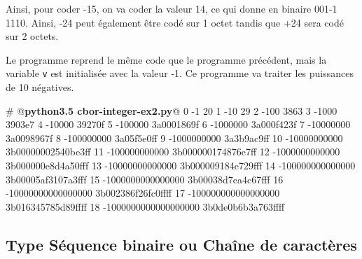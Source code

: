        \vspace{1em}

Ainsi, pour coder -15, on va coder la valeur 14, ce qui donne en binaire 001-1 1110. Ainsi, -24 peut également être codé sur 1 octet tandis que +24 sera codé sur 2 octets.


Le programme  reprend le même code que le programme précédent, mais la variable \texttt{v} est initialisée avec la valeur -1. Ce programme va traiter les puissances de 10 négatives.

\begin{termc}[backgroundcolor=\color{palerod}, language=json, basicstyle=\ttfamily\small, escapechar=@]
  # @\textbf{python3.5 cbor-integer-ex2.py}@
  0                             -1 20
  1                            -10 29
  2                           -100 3863
  3                          -1000 3903e7
  4                         -10000 39270f
  5                        -100000 3a0001869f
  6                       -1000000 3a000f423f
  7                      -10000000 3a0098967f
  8                     -100000000 3a05f5e0ff
  9                    -1000000000 3a3b9ac9ff
 10                   -10000000000 3b00000002540be3ff
 11                  -100000000000 3b000000174876e7ff
 12                 -1000000000000 3b000000e8d4a50fff
 13                -10000000000000 3b000009184e729fff
 14               -100000000000000 3b00005af3107a3fff
 15              -1000000000000000 3b00038d7ea4c67fff
 16             -10000000000000000 3b002386f26fc0ffff
 17            -100000000000000000 3b016345785d89ffff
 18           -1000000000000000000 3b0de0b6b3a763ffff
\end{termc}


\subsection{Type Séquence binaire ou Chaîne de caractères}

